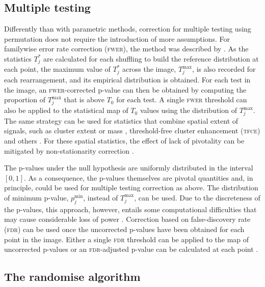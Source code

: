 \subsection{Multiple testing}

Differently than with parametric methods, correction for multiple testing using permutation does not require the introduction of more assumptions. For familywise error rate correction (\textsc{fwer}), the method was described by \citet{Holmes1996}. As the statistics $T_{j}^{*}$ are calculated for each shuffling to build the reference distribution at each point, the maximum value of $T_{j}^{*}$ across the image, $T_{j}^{\text{max}}$, is also recorded for each rearrangement, and its empirical distribution is obtained. For each test in the image, an \textsc{fwer}-corrected p-value can then be obtained by computing the proportion of $T_{j}^{\text{max}}$ that is above $T_{0}$ for each test. A single \textsc{fwer} threshold can also be applied to the statistical map of $T_{0}$ values using the distribution of $T_{j}^{\text{max}}$. The same strategy can be used for statistics that combine spatial extent of signals, such as cluster extent or mass \citep{Bullmore1999}, threshold-free cluster enhancement (\textsc{tfce}) \citep{Smith2009} and others \citep{Marroquin2011}. For these spatial statistics, the effect of lack of pivotality can be mitigated by non-stationarity correction \citep{Hayasaka2004_nonstationary, Salimi-Khorshidi2011}.

The p-values under the null hypothesis are uniformly distributed in the interval $[0,1]$. As a consequence, the p-values themselves are
pivotal quantities and, in principle, could be used for multiple testing correction as above. The distribution of minimum p-value, $p_{j}^{\text{min}}$, instead of $T_{j}^{\text{max}}$, can be used. Due to the discreteness of the p-values, this approach, however, entails some computational difficulties that may cause considerable loss of power \citep{Pantazis2005}. Correction based on false-discovery rate (\textsc{fdr}) can be used once the uncorrected p-values have been obtained for each point in the image. Either a single \textsc{fdr} threshold can be applied to the map of uncorrected p-values \citep{Benjamini1995, Genovese2002} or an \textsc{fdr}-adjusted p-value can be calculated at each point \citep{Yekutieli1999}.

\subsection{The randomise algorithm}
\label{sec:perm:randomise}

